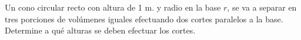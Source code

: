\item Un cono circular recto con altura de 1 m. y radio en la base $r$, se va a separar en tres porciones de volúmenes iguales efectuando dos cortes paralelos a la base. Determine a qué alturas se deben efectuar los cortes.
